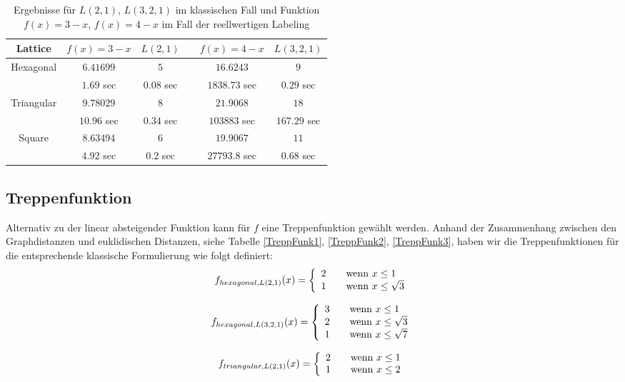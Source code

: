 \documentclass[
	fontsize=12pt,
	paper=a4,
	twoside=false,
	numbers=noenddot,
	plainheadsepline,
	toc=listof,
	toc=bibliography
]{scrartcl}
\begin{document}
\begin{table}[htbp]
\centering
  \begin{tabular}{|c|c|c| c|c|c|}
  \hline Lattice & $f(x) =3-x$  & $L(2,1)$ & & $f(x) =4-x$  & $L(3,2,1)$\\ \hline 
    Hexagonal & $6.41699$ & $5$ & &  $16.6243$ & $9$ \\ 
			& $1.69$ sec & $0.08$ sec& & $1838.73$ sec	& $0.29$ sec\\ \hline
	Triangular & $9.78029$ & $8$ & & $21.9068$ & $18$ \\
			& $10.96$ sec	& $0.34$ sec& & $103883$ sec & $167.29$ sec\\ \hline
    Square	& $8.63494$ & $6$ & & $19.9067$ & $11$ \\
			& $4.92$ sec & $0.2$ sec & & $27793.8$ sec & $0.68$ sec\\
  \hline
  \end{tabular}
\caption{Ergebnisse für  $L(2,1)$, $L(3,2,1)$ im klassischen Fall und Funktion $f(x)=3-x$, $f(x)=4-x$ im Fall der reellwertigen Labeling }
\label{Table:Table1}
\end{table}

\subsection{Treppenfunktion}

Alternativ zu der linear absteigender Funktion kann für $f$ eine Treppenfunktion gewählt werden. Anhand der Zusammenhang zwischen den Graphdistanzen und euklidischen Distanzen,
siehe Tabelle \ref{TreppFunk1}, \ref{TreppFunk2}, \ref{TreppFunk3}, haben wir die Treppenfunktionen für die entsprechende klassische Formulierung wie folgt definiert:
\[ f_{hexagonal,L(2,1)}(x) = \left\{
  \begin{array}{l l}
    2 & \quad \text{wenn $x\le 1$}\\
    1 & \quad \text{wenn $x\le \sqrt{3}$}
  \end{array} \right.\]

\[ f_{hexagonal,L(3,2,1)}(x) = \left\{
  \begin{array}{l l}
    3 & \quad \text{wenn $x\le 1$}\\
    2 & \quad \text{wenn $x\le \sqrt{3}$}\\
    1 & \quad \text{wenn $x\le \sqrt{7}$}
  \end{array} \right.\]


\[ f_{triangular,L(2,1)}(x) = \left\{
  \begin{array}{l l}
    2 & \quad \text{wenn $x\le 1$}\\
    1 & \quad \text{wenn $x\le 2$}
  \end{array} \right.\]
\end{document}
